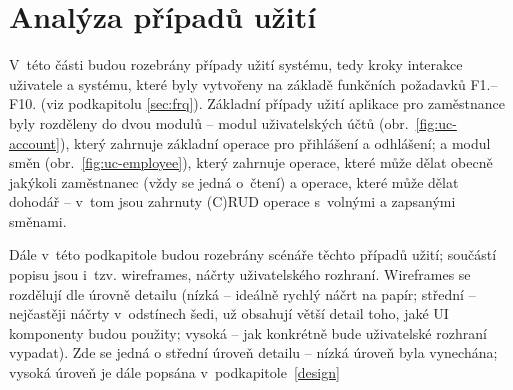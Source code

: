 \documentclass[twoside]{ctuthesis}
\begin{document}
%
%

\newpage
\section{Analýza případů užití}\label{uc-analysis}
V~této části budou rozebrány případy užití systému, tedy kroky interakce uživatele a systému, které byly vytvořeny na základě funkčních požadavků F1.--F10. (viz podkapitolu \ref{sec:frq}). Základní případy užití aplikace pro zaměstnance byly rozděleny do dvou modulů -- modul uživatelských účtů (obr.~\ref{fig:uc-account}), který zahrnuje základní operace pro přihlášení a odhlášení; a modul směn (obr.~\ref{fig:uc-employee}), který zahrnuje operace, které může dělat obecně jakýkoli zaměstnanec (vždy se jedná o~čtení) a operace, které může dělat dohodář -- v~tom jsou zahrnuty (C)RUD operace s~volnými a zapsanými směnami.

Dále v~této podkapitole budou rozebrány scénáře těchto případů užití; součástí popisu jsou i~tzv. wireframes, náčrty uživatelského rozhraní. Wi\-re\-fra\-mes se rozdělují dle úrovně detailu (nízká -- ideálně rychlý náčrt na papír; střední -- nejčastěji náčrty v~odstínech šedi, už obsahují větší detail toho, jaké UI kom\-po\-nen\-ty budou použity; vysoká -- jak konkrétně bude uživatelské rozhraní vypadat). \cite{lazarova2020low} Zde se jedná o střední úroveň detailu -- nízká úroveň byla vynechána; vysoká úroveň je dále popsána v~podkapitole~\ref{design}
\end{document}
